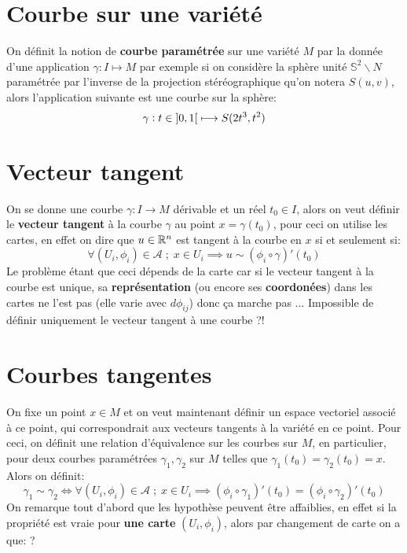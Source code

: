 \section{Courbe sur une variété}
On définit la notion de \textbf{courbe paramétrée} sur une variété \( M \) par la donnée d'une application \( \gamma : I \longmapsto M \) par exemple si on considère la sphère unité \(\mathbb{S}^2 \backslash N\) paramétrée par l'inverse de la projection stéréographique qu'on notera \( S(u, v) \), alors l'application suivante est une courbe sur la sphère:
\[ 
   \gamma : t \in \ioo{0}{1} \longmapsto S(2t^3, t^2)
\]
\section{Vecteur tangent}
On se donne une courbe \( \gamma :  I \rightarrow M\) dérivable et un réel \( t_0 \in I \), alors on veut définir le \textbf{vecteur tangent} à la courbe \( \gamma \) au point \( x = \gamma(t_0) \), pour ceci on utilise les cartes, en effet on dire que \( u \in \mathbb{R}^n \) est tangent à la courbe en \( x \) si et seulement si:
\[ 
   \forall (U_i, \phi_i) \in \mathcal{A} \; ; \; x \in U_i \implies u \sim (\phi_i \circ \gamma)'(t_0) 
\]
Le problème étant que ceci dépends de la carte car si le vecteur tangent à la courbe est unique, sa \textbf{représentation} (ou encore ses \textbf{coordonées}) dans les cartes ne l'est pas (elle varie avec \( d\phi_{ij} \)) donc ça marche pas ... Impossible de définir uniquement le vecteur tangent à une courbe ?!
\section{Courbes tangentes}
On fixe un point \( x \in M \) et on veut maintenant définir un espace vectoriel associé à ce point, qui correspondrait aux vecteurs tangents à la variété en ce point. Pour ceci, on définit une relation d'équivalence sur les courbes sur \( M \), en particulier, pour deux courbes paramétrées \( \gamma_1, \gamma_2 \) sur \( M \) telles que \( \gamma_1(t_0) = \gamma_2(t_0) = x \). Alors on définit:
\[ 
   \gamma_1 \sim \gamma_2 \iff \forall (U_i, \phi_i) \in \mathcal{A} \; ; \; x \in U_i \implies (\phi_i \circ \gamma_1)'(t_0) = (\phi_i \circ \gamma_2)'(t_0)
\]
On remarque tout d'abord que les hypothèse peuvent être affaiblies, en effet si la propriété est vraie pour \textbf{une carte} \( (U_i, \phi_i) \), alors par changement de carte on a que: ?\<


